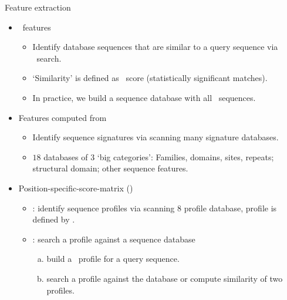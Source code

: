 \documentclass[first=dgreen,second=purple,logo=yellowexc]{aaltoslides}
\begin{document}
\begin{frame}{Feature extraction}
	\begin{itemize}
		\item \blast\ features
			\begin{itemize}\footnotesize
				\item Identify database sequences that are similar to a query sequence via \blast\ search.
				\item `Similarity' is defined as \blast\ score (statistically significant matches).
				\item In practice, we build a sequence database with all \tcdb\ sequences.
			\end{itemize}
		\item Features computed from {{\interproscan}}
		\begin{itemize}\footnotesize
			\item Identify sequence signatures via scanning many signature databases.
			\item $18$ databases of $3$ `big categories': {\purple Families, domains, sites, repeats}; {\pink structural domain}; {\red other sequence features}.
		\end{itemize}
		\item Position-specific-score-matrix (\pssm)
		\begin{itemize}\footnotesize
			\item \href{http://www3.imperial.ac.uk/pls/portallive/docs/1/5037998.RPS}{\rpsblast}: identify sequence profiles via scanning $8$ profile database, profile is defined by \pssm.
			\item \href{http://www.ncbi.nlm.nih.gov/books/NBK2590/}{\psiblast}: search a profile against a sequence database
			\begin{enumerate}[(a)]\footnotesize
				\item build a \pssm\ profile for a query sequence.
				\item {\red search a profile against the database} or {\purple compute similarity of two profiles}.
			\end{enumerate}
		\end{itemize}
	\end{itemize}
\end{frame}
\end{document}
